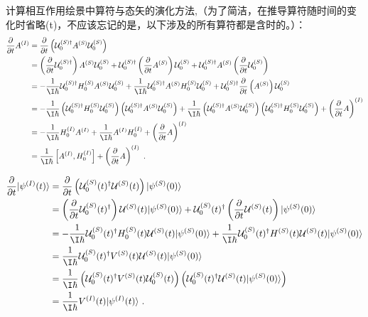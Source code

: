 计算相互作用绘景中算符与态矢的演化方法,（为了简洁，在推导算符随时间的变化时省略(t)，不应该忘记的是，以下涉及的所有算符都是含时的。）：
\begin{align}
\frac{\partial}{\partial t}A^{(I)}&=\frac{\partial}{\partial t}\left(\mathcal U^{(S)\dagger}_0 A^{(S)}\mathcal U^{(S)}_0 \right)\\
&=\left(\frac{\partial}{\partial t}\mathcal U^{(S)\dagger}_0\right) A^{(S)}\mathcal U^{(S)}_0 +\mathcal U^{(S)\dagger}_0 \left(\frac{\partial}{\partial t}A^{(S)}\right)\mathcal U^{(S)}_0+\mathcal U^{(S)\dagger}_0 A^{(S)}\left(\frac{\partial}{\partial t}\mathcal U^{(S)}_0\right)\\
&=-\frac{1}{\I\hbar}\mathcal U^{(S)\dagger}_0 H^{(S)}_0A^{(S)}\mathcal U^{(S)}_0 +\frac{1}{\I\hbar}\mathcal U^{(S)\dagger}_0 A^{(S)}H^{(S)}_0\mathcal U^{(S)}_0+\mathcal U^{(S)\dagger}_0 \frac{\partial}{\partial t}\left(A^{(S)}\right)\mathcal U^{(S)}_0 \\
&=-\frac{1}{\I\hbar}\left(\mathcal U^{(S)\dagger}_0 H^{(S)}_0 \mathcal U^{(S)}_0\right)\left(\mathcal U^{(S)\dagger}_0 A^{(S)}\mathcal U^{(S)}_0\right) +\frac{1}{\I\hbar}\left(\mathcal U^{(S)\dagger}_0 A^{(S)}\mathcal U^{(S)}_0\right)\left(\mathcal U^{(S)\dagger}_0 H^{(S)}_0\mathcal U^{(S)}_0\right)+\left(\frac{\partial}{\partial t}A\right)^{(I)} \\
&=-\frac{1}{\I\hbar} H^{(I)}_0  A^{(I)}+\frac{1}{\I\hbar} A^{(I)} H^{(I)}_0+\left(\frac{\partial}{\partial t}A\right)^{(I)} \\
&=\frac{1}{\I\hbar}\left[A^{(I)},H_0^{(I)}\right]+\left(\frac{\partial}{\partial t}A\right)^{(I)}~.
\end{align}

\begin{align}
\frac{\partial}{\partial t}|\psi^{(I)}(t)\rangle&=
\frac{\partial}{\partial t}\left(\mathcal U^{(S)}_0(t)^\dagger\mathcal U^{(S)}(t)\right)|\psi^{(S)}(0)\rangle \\
&=\left(\frac{\partial}{\partial t}\mathcal U^{(S)}_0(t)^\dagger\right)\mathcal U^{(S)}(t)|\psi^{(S)}(0)\rangle+\mathcal U^{(S)}_0(t)^\dagger\left(\frac{\partial}{\partial t}\mathcal U^{(S)}(t)\right)|\psi^{(S)}(0)\rangle \\
&=-\frac{1}{\I\hbar}\mathcal U^{(S)}_0(t)^\dagger H^{(S)}_0(t)\mathcal U^{(S)}(t)|\psi^{(S)}(0)\rangle+\frac{1}{\I\hbar}\mathcal U^{(S)}_0(t)^\dagger H^{(S)}(t)\mathcal U^{(S)}(t) |\psi^{(S)}(0)\rangle \\
&=\frac{1}{\I\hbar}\mathcal U^{(S)}_0(t)^\dagger V^{(S)}(t)\mathcal U^{(S)}(t) |\psi^{(S)}(0)\rangle \\
&=\frac{1}{\I\hbar}\left(\mathcal U^{(S)}_0(t)^\dagger V^{(S)}(t)\mathcal U^{(S)}_0(t)\right)\left(\mathcal U^{(S)}_0(t)^\dagger\mathcal U^{(S)}(t) |\psi^{(S)}(0)\rangle\right) \\
&=\frac{1}{\I\hbar}V^{(I)}(t)|\psi^{(I)}(t)\rangle~.
\end{align}

